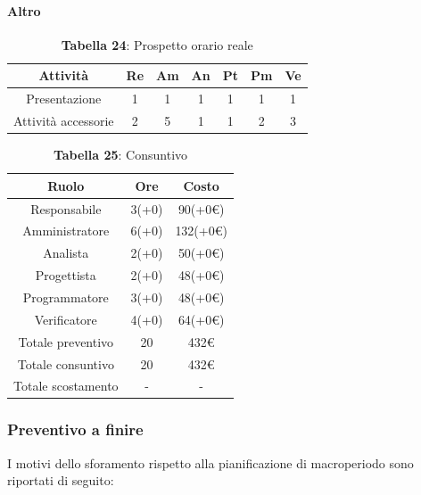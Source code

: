\paragraph{Altro}
\begin{table}[H]
	\centering
	\begin{tabular}{|c|c|c|c|c|c|c|}
		\hline
		\rowcolor{lighter-grayer}
		\textbf{Attività} & \textbf{Re}        & \textbf{Am}        & \textbf{An}        & \textbf{Pt}        & \textbf{Pm}        & \textbf{Ve}        \\ \hline
		
		Presentazione       & 1           & 1           & 1           & 1           & 1           & 1           \\ \hline
		Attività accessorie & 2           & 5           & 1           & 1           & 2           & 3           \\ \hline
		
	\end{tabular}
	\caption*{\textbf{Tabella 24}: Prospetto orario reale\\}
\end{table}

\begin{table}[H]
	\centering
	\renewcommand{\arraystretch}{1.5}
	\begin{tabular}{|c|c|c|}
		\hline
		\rowcolor{lighter-grayer}
		Ruolo & Ore & Costo \\ \hline
		Responsabile & 3(+0) & 90(+0\euro) \\ \hline
		Amministratore & 6(+0) & 132(+0\euro) \\ \hline
		Analista & 2(+0) & 50(+0\euro) \\ \hline
		Progettista & 2(+0) & 48(+0\euro) \\ \hline
		Programmatore & 3(+0) & 48(+0\euro) \\ \hline
		Verificatore & 4(+0) & 64(+0\euro) \\ \hline
		Totale preventivo & 20 & 432\euro \\ \hline
		Totale consuntivo & 20 & 432\euro \\ \hline
		Totale scostamento & - & - \\ \hline
	\end{tabular}
	\caption*{\textbf{Tabella 25}: Consuntivo\\}
\end{table}

\subsubsection{Preventivo a finire}
I motivi dello sforamento rispetto alla pianificazione di macroperiodo sono riportati di seguito:

